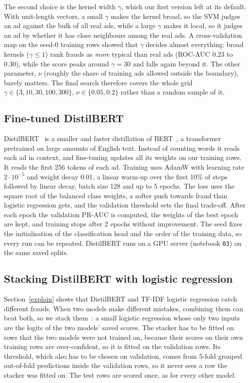 The second choice is the kernel width $\gamma$, which our first version left at its default. With
unit-length vectors, a small $\gamma$ makes the kernel broad, so the SVM judges an ad against the
bulk of all real ads, while a large $\gamma$ makes it local, so it judges an ad by whether it has
close neighbours among the real ads. A cross-validation map on the seed-0 training rows showed
that $\gamma$ decides almost everything: broad kernels ($\gamma \le 1$) rank frauds as \emph{more}
typical than real ads (ROC-AUC 0.23 to 0.30), while the score peaks around $\gamma = 30$ and falls
again beyond it. The other parameter, $\nu$ (roughly the share of training ads allowed outside
the boundary), barely matters. The final search therefore covers the whole grid
$\gamma \in \{3, 10, 30, 100, 300\}$, $\nu \in \{0.05, 0.2\}$ rather than a random sample of it.

\subsection{Fine-tuned DistilBERT}

DistilBERT~\cite{sanh2019} is a smaller and faster distillation of BERT~\cite{devlin2019}, a
transformer pretrained on large amounts of English text. Instead of counting words it reads each
ad in context, and fine-tuning updates all its weights on our training rows. It reads the first
256 tokens of each ad. Training uses AdamW with learning rate $2 \cdot 10^{-5}$ and weight decay
0.01, a linear warm-up over the first 10\% of steps followed by linear decay, batch size 128 and up
to 5 epochs. The loss uses the square root of the balanced class weights, a softer push towards
fraud than logistic regression gets, and the validation threshold sets the final trade-off. After
each epoch the validation PR-AUC is computed, the weights of the best epoch are kept, and training
stops after 2 epochs without improvement. The seed fixes the initialisation of the classification
head and the order of the training data, so every run can be repeated. DistilBERT runs on a GPU
server (notebook \texttt{03}) on the same saved splits.

\subsection{Stacking DistilBERT with logistic regression}
\label{stacking}

Section~\ref{explain} shows that DistilBERT and TF-IDF logistic regression catch different frauds.
When two models make different mistakes, combining them can beat both, so we stack
them~\cite{wolpert1992}: a small logistic regression whose only two inputs are the logits of the
two models' saved scores. The stacker has to be fitted on rows that the two models were not
trained on, because their scores on their own training rows are over-confident, so it is fitted
on the validation rows. Its threshold, which also has to be chosen on validation, comes from 5-fold
grouped out-of-fold predictions inside the validation rows, so it never sees a row the stacker was
fitted on. The test rows are scored once, as for every other model.

